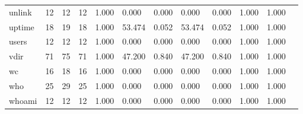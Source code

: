 \begin{longtable}{lp{1.00cm}p{1.00cm}p{1.00cm}p{1.00cm}p{1.00cm}p{1.00cm}p{1.00cm}p{1.00cm}p{1.00cm}p{1.00cm}p{1.00cm}}
unlink    &                           12 &                 12 &                                12 &                                      1.000 &                                  0.000 &                                        0.000 &                             0.000 &                                   0.000 &                        1.000 &                                        1.000 \\
uptime    &                           18 &                 19 &                                18 &                                      1.000 &                                 53.474 &                                        0.052 &                            53.474 &                                   0.052 &                        1.000 &                                        1.000 \\
users     &                           12 &                 12 &                                12 &                                      1.000 &                                  0.000 &                                        0.000 &                             0.000 &                                   0.000 &                        1.000 &                                        1.000 \\
vdir      &                           71 &                 75 &                                71 &                                      1.000 &                                 47.200 &                                        0.840 &                            47.200 &                                   0.840 &                        1.000 &                                        1.000 \\
wc        &                           16 &                 18 &                                16 &                                      1.000 &                                  0.000 &                                        0.000 &                             0.000 &                                   0.000 &                        1.000 &                                        1.000 \\
who       &                           25 &                 29 &                                25 &                                      1.000 &                                  0.000 &                                        0.000 &                             0.000 &                                   0.000 &                        1.000 &                                        1.000 \\
whoami    &                           12 &                 12 &                                12 &                                      1.000 &                                  0.000 &                                        0.000 &                             0.000 &                                   0.000 &                        1.000 &                                        1.000 \\

\end{longtable}
